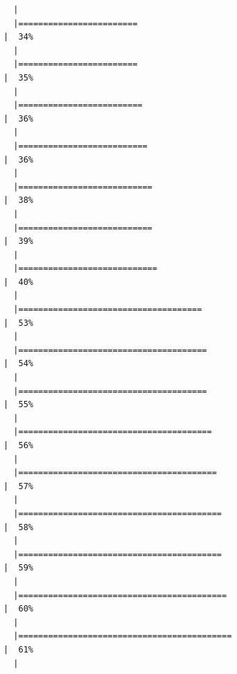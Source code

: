 \documentclass[
  letterpaper,
  DIV=11,
  numbers=noendperiod]{scrreprt}
\begin{document}
\begin{verbatim}
  |                                                                            
  |========================                                              |  34%
  |                                                                            
  |========================                                              |  35%
  |                                                                            
  |=========================                                             |  36%
  |                                                                            
  |==========================                                            |  36%
  |                                                                            
  |===========================                                           |  38%
  |                                                                            
  |===========================                                           |  39%
  |                                                                            
  |============================                                          |  40%
  |                                                                            
  |=====================================                                 |  53%
  |                                                                            
  |======================================                                |  54%
  |                                                                            
  |======================================                                |  55%
  |                                                                            
  |=======================================                               |  56%
  |                                                                            
  |========================================                              |  57%
  |                                                                            
  |=========================================                             |  58%
  |                                                                            
  |=========================================                             |  59%
  |                                                                            
  |==========================================                            |  60%
  |                                                                            
  |===========================================                           |  61%
  |                                                                            

\end{verbatim}
\end{document}
